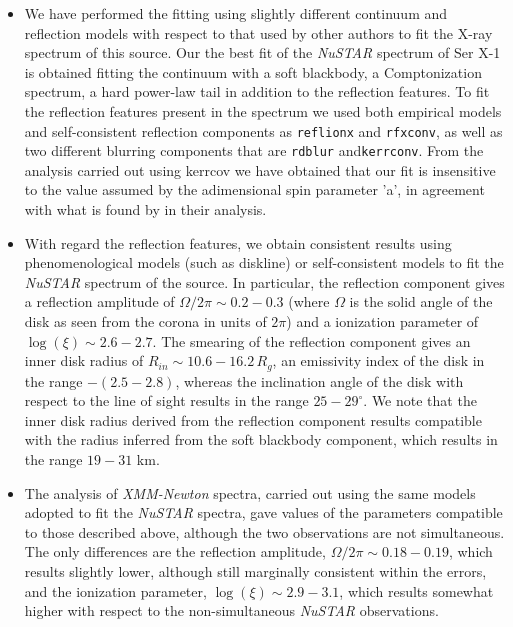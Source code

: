 \documentclass{aa}
\begin{document}
\begin{itemize}

\item We have performed the fitting using %
slightly different continuum and reflection models with respect to that used 
by other authors to fit the X-ray spectrum of this source. Our the best fit 
of the \emph{NuSTAR} spectrum of Ser X-1 is obtained fitting the continuum with 
a soft blackbody, a Comptonization spectrum, a hard power-law tail in addition 
to the reflection features. To fit the reflection features present in
the spectrum we used both empirical models and self-consistent reflection 
components as \texttt{reflionx} and \texttt{rfxconv}, as well as two 
different blurring components that are \texttt{rdblur} and\texttt{kerrconv}. 
From the analysis carried out using kerrcov we have obtained that  our fit is 
insensitive to the value assumed by the adimensional spin parameter 'a', 
in agreement with what is found by \citet{Miller.etal:13} in their analysis.

\item With regard the reflection features, we obtain consistent results
using phenomenological models (such as diskline) or self-consistent models
to fit the \emph{NuSTAR} spectrum of the source. 
In particular, the reflection component gives a reflection amplitude of 
$\Omega / 2 \pi \sim 0.2-0.3$ (where $\Omega$ is the solid angle of the disk
as seen from the corona in units of $2 \pi$) and a ionization parameter of 
$\log (\xi) \sim 2.6-2.7$. 
The smearing of the reflection component gives an inner disk radius of 
$R_{in} \sim 10.6 - 16.2\, R_{g}$, an emissivity index of the disk in the range 
$-(2.5-2.8)$, whereas the inclination angle of the disk with respect to the 
line of sight results in the range $25 - 29^\circ$. We note that the 
inner disk radius derived from the reflection component results compatible 
with the radius inferred from the soft blackbody component, which results in 
the range $19 - 31$ km. 

\item The analysis of \emph{XMM-Newton} spectra, carried out using the same 
models adopted to fit the \emph{NuSTAR} spectra, gave values of the parameters
compatible to those described above, although the two observations are
not simultaneous. The only differences are the reflection amplitude, 
$\Omega / 2 \pi \sim 0.18 - 0.19$, which results slightly lower, although still 
marginally consistent within the errors, and the ionization parameter, 
$\log (\xi) \sim 2.9 - 3.1$, which results somewhat higher with respect to the 
non-simultaneous \emph{NuSTAR} observations.

\end{itemize}
\end{document}
